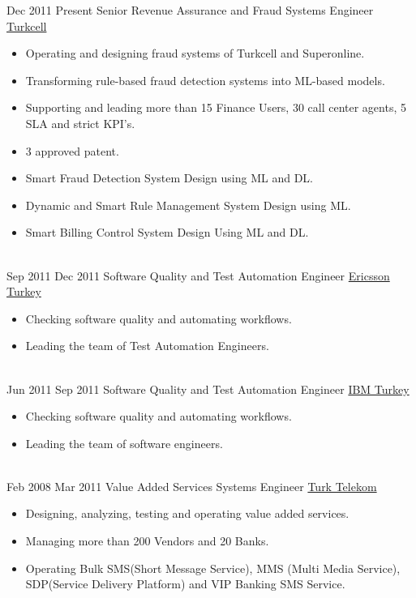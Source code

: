 \documentclass[letterpaper]{onur_class_file} %
\begin{document}
\begin{twenty}
	\twentyitem
		{Dec 2011}
		{Present}
		{\hspace{0.3cm}Senior Revenue Assurance and Fraud Systems Engineer}
		{\href{https://www.turkcell.com.tr/}{Turkcell}}
		{}
		{\begin{itemize}
			\item Operating and designing fraud systems of Turkcell and Superonline. 
			\item Transforming rule-based fraud detection systems into ML-based models.
			\item Supporting and leading more than 15 Finance Users, 30 call center agents, 5 SLA and strict KPI's.
			\item 3 approved patent.
			\item Smart Fraud Detection System Design using ML and DL.
			\item Dynamic and Smart Rule Management System Design using ML.
			\item Smart Billing Control System Design Using ML and DL.
		\end{itemize}}
		\\
	\twentyitem
    	{Sep 2011}
		{Dec 2011}
        {\hspace{0.3cm}Software Quality and Test Automation Engineer}
        {\href{https://www.ericsson.com}{Ericsson Turkey}}
        {}
        {\begin{itemize}
        \item Checking software quality and automating workflows.
        \item Leading the team of Test Automation Engineers. 
        \end{itemize}}
        \\
	\twentyitem
    	{Jun 2011}
		{Sep 2011}
        {\hspace{0.3cm}Software Quality and Test Automation Engineer}
        {\href{https://www.ibm.com/tr-tr/}{ IBM Turkey}}
        {}
        {
        {\begin{itemize}
        \item Checking software quality and automating workflows.
        \item Leading the team of software engineers.
    \end{itemize}}
        }
    \\   
    \twentyitem
   		{Feb 2008}
		{Mar 2011}
        {\hspace{0.3cm}Value Added Services Systems Engineer}
        {\href{https://www.turktelekom.com.tr}{Turk Telekom}}
        {}
        {
        {\begin{itemize}
        \item Designing, analyzing, testing and operating value added services.
        \item Managing more than 200 Vendors and 20 Banks.
        \item Operating Bulk SMS(Short Message Service), MMS (Multi Media Service), SDP(Service Delivery Platform) and VIP Banking SMS Service.
    \end{itemize}}
        }
        \\            
\end{twenty}
\end{document}
